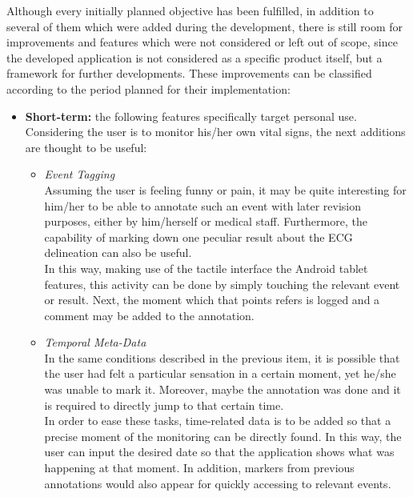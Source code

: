 		Although every initially planned objective has been fulfilled, in addition to several of them which
		were added during the development, there is still room for improvements and features which were
		not considered or left out of scope, since the developed application is not considered as a specific
		product itself, but a framework for further developments. These improvements can be classified according 
		to the period planned for their implementation:

		\begin{itemize}
			\item \textbf{Short-term:} the following features specifically target personal use. Considering
				the user is to monitor his/her own vital signs, the next additions are thought to be useful:

				\begin{itemize}
					\item \emph{Event Tagging}\\
						Assuming the user is feeling funny or pain, it may be quite interesting for him/her
						to be able to annotate such an event with later revision purposes, either by
						him/herself or medical staff. Furthermore, the capability of marking down one peculiar
						result about the ECG delineation can also be useful.\\

						In this way, making use of the tactile interface the Android tablet features, this
						activity can be done by simply touching the relevant event or result. Next, the moment
						which that points refers is logged and a comment may be added to the annotation.\\

					\item \emph{Temporal Meta-Data}\\
						In the same conditions described in the previous item, it is possible that the user
						had felt a particular sensation in a certain moment, yet he/she was unable to mark it.
						Moreover, maybe the annotation was done and it is required to directly jump to that
						certain time.\\

						In order to ease these tasks, time-related data is to be added so that a precise
						moment of the monitoring can be directly found. In this way, the user can input
						the desired date so that the application shows what was happening at that moment.
						In addition, markers from previous annotations would also appear for quickly accessing
						to relevant events.\\


\end{itemize}
\end{itemize}
